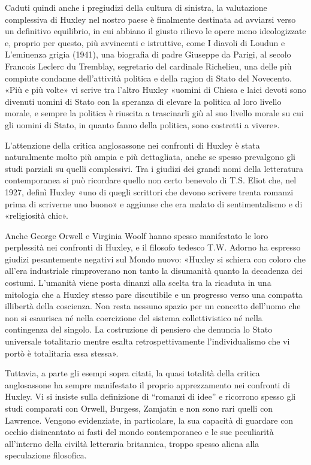\documentclass[
a5paper, %
10pt, %
twoside, 
onecolumn, %
openany, %
]{memoir}
\begin{document}
Caduti quindi anche i pregiudizi della cultura di sinistra, la valutazione complessiva di Huxley nel nostro paese è finalmente destinata ad avviarsi verso un definitivo equilibrio, in cui abbiano il giusto rilievo le opere meno ideologizzate e, proprio per questo, più avvincenti e istruttive, come I diavoli di Loudun e L’eminenza grigia (1941), una biografia di padre Giuseppe da Parigi, al secolo Francois Leclerc du Tremblay, segretario del cardinale Richelieu, una delle più compiute condanne dell’attività politica e della ragion di Stato del Novecento. «Più e più volte» vi scrive tra l’altro Huxley «uomini di Chiesa e laici devoti sono divenuti uomini di Stato con la speranza di elevare la politica al loro livello morale, e sempre la politica è riuscita a trascinarli giù al suo livello morale su cui gli uomini di Stato, in quanto fanno della politica, sono costretti a vivere».

L’attenzione della critica anglosassone nei confronti di Huxley è stata naturalmente molto più ampia e più dettagliata, anche se spesso prevalgono gli studi parziali su quelli complessivi. Tra i giudizi dei grandi nomi della letteratura contemporanea si può ricordare quello non certo benevolo di T.S. Eliot che, nel 1927, definì Huxley «uno di quegli scrittori che devono scrivere trenta romanzi prima di scriverne uno buono» e aggiunse che era malato di sentimentalismo e di «religiosità chic».

Anche George Orwell e Virginia Woolf hanno spesso manifestato le loro perplessità nei confronti di Huxley, e il filosofo tedesco T.W. Adorno ha espresso giudizi pesantemente negativi sul Mondo nuovo: «Huxley si schiera con coloro che all’era industriale rimproverano non tanto la disumanità quanto la decadenza dei costumi. L’umanità viene posta dinanzi alla scelta tra la ricaduta in una mitologia che a Huxley stesso pare discutibile e un progresso verso una compatta illibertà della coscienza. Non resta nessuno spazio per un concetto dell’uomo che non si esaurisca né nella coercizione del sistema collettivistico né nella contingenza del singolo. La costruzione di pensiero che denuncia lo Stato universale totalitario mentre esalta retrospettivamente l’individualismo che vi portò è totalitaria essa stessa».

Tuttavia, a parte gli esempi sopra citati, la quasi totalità della critica anglosassone ha sempre manifestato il proprio apprezzamento nei confronti di Huxley. Vi si insiste sulla definizione di “romanzi di idee” e ricorrono spesso gli studi comparati con Orwell, Burgess, Zamjatin e non sono rari quelli con Lawrence. Vengono evidenziate, in particolare, la sua capacità di guardare con occhio disincantato ai fasti del mondo contemporaneo e le sue peculiarità all’interno della civiltà letteraria britannica, troppo spesso aliena alla speculazione filosofica.
\end{document}
